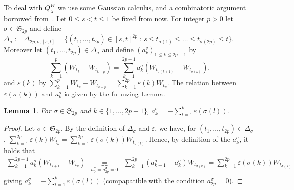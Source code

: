 \documentclass[11pt,a4paper,draft,reqno]{amsart}
\newtheorem{lemma}{Lemma}
\theoremstyle{definition}
\newcommand{\eps}{\varepsilon}
\renewcommand{\S}{\mathfrak{S}}
\begin{document}
 To deal with $Q^W_\lambda$ we use some Gaussian calculus, and  a combinatoric argument borrowed from~\cite{NRT}.
Let $0\le s< t \le 1$ be fixed from now. For integer $p>0$ let $\sigma\in\S_{2p}$ and define 
$\Delta_{\sigma}:=\Delta_{2p,\sigma,[s,t]}=\{(t_1,\dots,t_{2p})\in[s,t]^{2p}\ : \ s\le t_{\sigma(1)} \le \dots \le
t_{\sigma(2p)} \le t \}$.
Moreover let $(t_1,\dots,t_{2p})\in\Delta_{\sigma}$ and define $(a_k^\sigma)_{1 \le k\le 2p-1}$ by 
$$\sum_{k=1}^p(W_{t_k}-W_{t_{k+p}})=\sum_{k=1}^{2p-1}a_{k}^\sigma (W_{t_{\sigma(k+1)}}-W_{t_{\sigma(k)}}).$$ and $\eps(k)$ by
$\sum_{k=1}^p W_{t_{k}}-W_{t_{k+p}} = \sum_{k=1}^{2p}\eps(k)W_{t_k}$.
The relation between $\eps(\sigma(k))$ and $a^\sigma_k$ is given by the following Lemma.
\begin{lemma}
For $\sigma\in\S_{2p}$ and $k\in\{1,\dots,2p-1\}$, 
$a_k^\sigma=-\sum_{l=1}^{k}\eps(\sigma(l))$.
\end{lemma}
\begin{proof}
Let $\sigma\in\S_{2p}$. By the definition of $\Delta_\sigma$ and $\eps$, we have, for $(t_1,\dots,t_{2p})\in \Delta_{\sigma}$,
$\sum_{k=1}^{2p}\eps(k)W_{t_{k}}=\sum_{k=1}^{2p}\eps(\sigma(k))W_{t_{\sigma(k)}}$.
 Hence, by definition of the $a_k^\sigma$, it holds that
\begin{eqnarray*}
\sum_{k=1}^{2p-1}a_k^\sigma\left(W_{t_{k+1}}-W_{t_{k}}\right)
& \underbrace{=}_{a_0^\sigma=a_{2p}^\sigma=0} &
\sum_{k=1}^{2p}\left(a_{k-1}^\sigma-a_k^\sigma\right)W_{t_{\sigma(k)}}
= 
\sum_{k=1}^{2p}\eps(\sigma(k))W_{t_{\sigma(k)}}
\end{eqnarray*}
giving
$a_k^\sigma=-\sum_{l=1}^{k}\eps(\sigma(l))$ (compapatible with the condition $a_{2p}^\sigma = 0$).
\end{proof}
\end{document}
